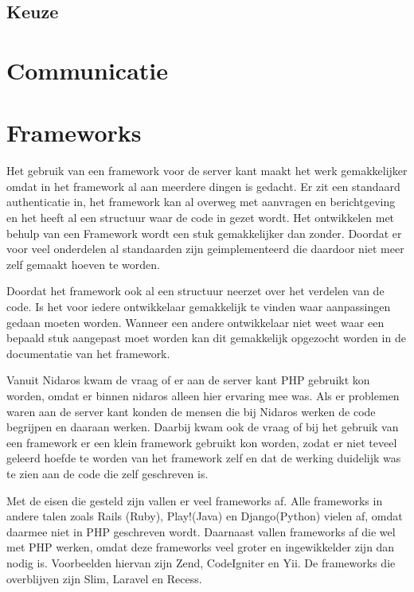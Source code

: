 \documentclass[a4paper,11pt,oneside]{report}
\begin{document}
\subsection{Keuze}

\section{Communicatie}

\section{Frameworks}
Het gebruik van een framework voor de server kant maakt het werk gemakkelijker omdat in het framework al aan meerdere dingen is gedacht. Er zit een standaard authenticatie in, het framework kan al overweg met aanvragen en berichtgeving en het heeft al een structuur waar de code in gezet wordt. Het ontwikkelen met behulp van een Framework wordt een stuk gemakkelijker dan zonder. Doordat er voor veel onderdelen al standaarden zijn geimplementeerd die daardoor niet meer zelf gemaakt hoeven te worden.

Doordat het framework ook al een structuur neerzet over het verdelen van de code. Is het voor iedere ontwikkelaar gemakkelijk te vinden waar aanpassingen gedaan moeten worden. Wanneer een andere ontwikkelaar niet weet waar een bepaald stuk aangepast moet worden kan dit gemakkelijk opgezocht worden in de documentatie van het framework.

Vanuit Nidaros kwam de vraag of er aan de server kant PHP gebruikt kon worden, omdat er binnen nidaros alleen hier ervaring mee was. Als er problemen waren aan de server kant konden de mensen die bij Nidaros werken de code begrijpen en daaraan werken. Daarbij kwam ook de vraag of bij het gebruik van een framework er een klein framework gebruikt kon worden, zodat er niet teveel geleerd hoefde te worden van het framework zelf en dat de werking duidelijk was te zien aan de code die zelf geschreven is.

Met de eisen die gesteld zijn vallen er veel frameworks af. Alle frameworks in andere talen zoals Rails (Ruby), Play!(Java) en Django(Python) vielen af, omdat daarmee niet in PHP geschreven wordt. Daarnaast vallen frameworks af die wel met PHP werken, omdat deze frameworks veel groter en ingewikkelder zijn dan nodig is. Voorbeelden hiervan zijn Zend, CodeIgniter en Yii. De frameworks die overblijven zijn Slim, Laravel en Recess.
\newline
\end{document}
